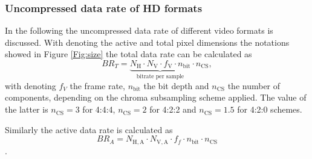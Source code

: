 \subsubsection*{Uncompressed data rate of HD formats}

In the following the uncompressed data rate of different video formats is discussed.
With denoting the active and total pixel dimensions the notations showed in Figure \ref{Fig:size} the total data rate can be calculated as
\begin{equation}
B\!R_T = \underbrace{N_{\mathrm{H}} \cdot N_{\mathrm{V}} \cdot f_{\mathrm{V}} \cdot n_{\mathrm{bit}}}_{\text{bitrate per sample}} \cdot n_{\mathrm{CS}},
\end{equation}
with denoting $f_{V}$ the frame rate, $n_{\mathrm{bit}}$ the bit depth and $n_{\mathrm{CS}}$ the number of components, depending on the chroma subsampling scheme applied.
The value of the latter is $n_{\mathrm{CS}} = 3$ for 4:4:4, $n_{\mathrm{CS}} = 2$ for 4:2:2 and $n_{\mathrm{CS}} = 1.5$ for 4:2:0 schemes.

Similarly the active data rate is calculated as
\begin{equation}
B\!R_A = N_{\mathrm{H,A}} \cdot N_{\mathrm{V,A}} \cdot f_f \cdot n_{\mathrm{bit}} \cdot n_{\mathrm{CS}}
\end{equation}.

